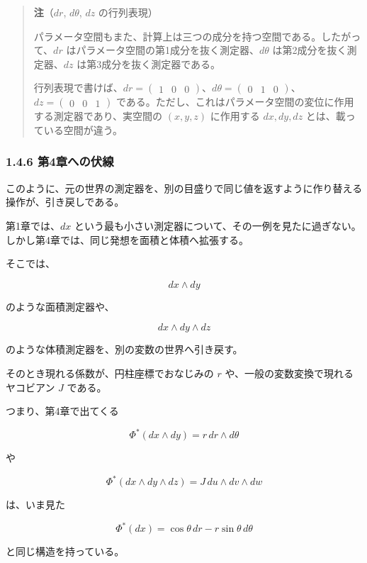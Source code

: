 \documentclass[a4paper,12pt,openany]{book}
\begin{document}
\begin{quote}
\textbf{注}（\(dr\), \(d\theta\), \(dz\) の行列表現）

パラメータ空間もまた、計算上は三つの成分を持つ空間である。したがって、\(dr\)
はパラメータ空間の第1成分を抜く測定器、\(d\theta\)
は第2成分を抜く測定器、\(dz\) は第3成分を抜く測定器である。

行列表現で書けば、\(dr=\begin{pmatrix}1&0&0\end{pmatrix}\)、\(d\theta=\begin{pmatrix}0&1&0\end{pmatrix}\)、\(dz=\begin{pmatrix}0&0&1\end{pmatrix}\)
である。ただし、これはパラメータ空間の変位に作用する測定器であり、実空間の
\((x,y,z)\) に作用する \(dx,dy,dz\) とは、載っている空間が違う。
\end{quote}

\hypertarget{ux7b2c4ux7ae0ux3078ux306eux4f0fux7dda}{%
\subsubsection{1.4.6
第4章への伏線}\label{ux7b2c4ux7ae0ux3078ux306eux4f0fux7dda}}

このように、元の世界の測定器を、別の目盛りで同じ値を返すように作り替える操作が、引き戻しである。

第1章では、\(dx\)
という最も小さい測定器について、その一例を見たに過ぎない。しかし第4章では、同じ発想を面積と体積へ拡張する。

そこでは、

\[
dx\wedge dy
\]

のような面積測定器や、

\[
dx\wedge dy\wedge dz
\]

のような体積測定器を、別の変数の世界へ引き戻す。

そのとき現れる係数が、円柱座標でおなじみの \(r\)
や、一般の変数変換で現れるヤコビアン \(J\) である。

つまり、第4章で出てくる

\[
\Phi^*(dx\wedge dy)=r\,dr\wedge d\theta
\]

や

\[
\Phi^*(dx\wedge dy\wedge dz)=J\,du\wedge dv\wedge dw
\]

は、いま見た

\[
\Phi^*(dx)
=
\cos\theta\,dr-r\sin\theta\,d\theta
\]

と同じ構造を持っている。
\end{document}
